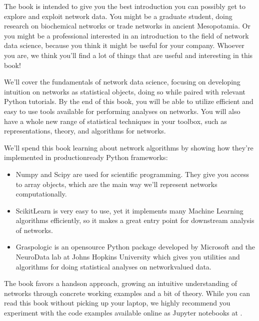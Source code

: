\documentclass[letterpaper,10pt,english]{jupyterBook}
\begin{document}
\sphinxAtStartPar
The book is intended to give you the best introduction you can possibly get to explore and exploit network data. You might be a graduate student, doing research on biochemical networks or trade networks in ancient Mesopotamia. Or you might be a professional interested in an introduction to the field of network data science, because you think it might be useful for your company. Whoever you are, we think you’ll find a lot of things that are useful and interesting in this book!

\sphinxAtStartPar
We’ll cover the fundamentals of network data science, focusing on developing intuition on networks as statistical objects, doing so while paired with relevant Python tutorials. By the end of this book, you will be able to utilize efficient and easy to use tools available for performing analyses on networks. You will also have a whole new range of statistical techniques in your toolbox, such as representations, theory, and algorithms for networks.

\sphinxAtStartPar
We’ll spend this book learning about network algorithms by showing how they’re implemented in production\sphinxhyphen{}ready Python frameworks:
\begin{itemize}
\item {} 
\sphinxAtStartPar
Numpy and Scipy are used for scientific programming. They give you access to array objects, which are the main way we’ll represent networks computationally.

\item {} 
\sphinxAtStartPar
Scikit\sphinxhyphen{}Learn is very easy to use, yet it implements many Machine Learning algorithms efficiently, so it makes a great entry point for downstream analysis of networks.

\item {} 
\sphinxAtStartPar
Graspologic is an open\sphinxhyphen{}source Python package developed by Microsoft and the NeuroData lab at Johns Hopkins University which gives you utilities and algorithms for doing statistical analyses on network\sphinxhyphen{}valued data.

\end{itemize}

\sphinxAtStartPar
The book favors a hands\sphinxhyphen{}on approach, growing an intuitive understanding of
networks through concrete working examples and a bit of theory.
While you can read this book without picking up your laptop, we highly recommend
you experiment with the code examples available online as Jupyter notebooks at .
\end{document}
